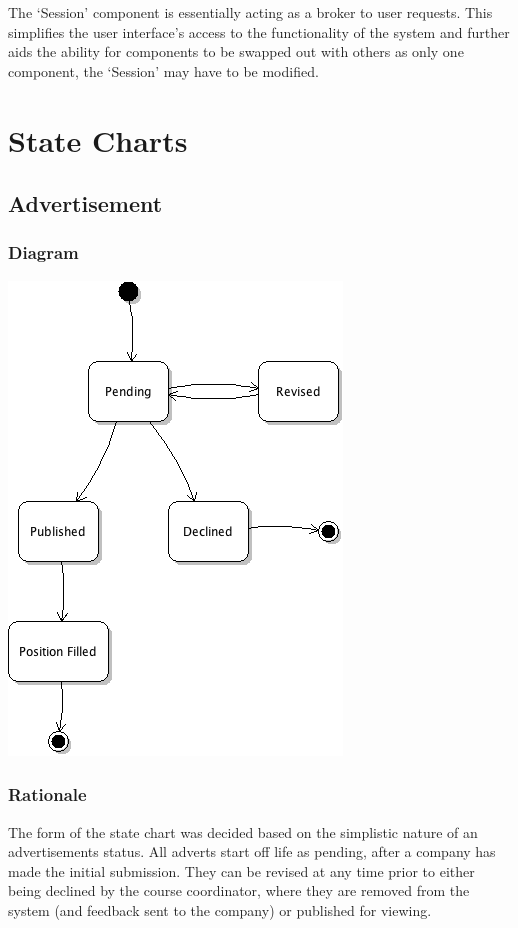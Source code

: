 \documentclass[11pt]{article}
\begin{document}
The `Session' component is essentially acting as a broker to user requests. This
simplifies the user interface's access to the functionality of the system and
further aids the ability for components to be swapped out with others as only
one component, the `Session' may have to be modified.

\newpage

\section{State Charts}

\subsection{Advertisement}

\subsubsection{Diagram}

\includegraphics{advertState.png}

\subsubsection{Rationale}

The form of the state chart was decided based on the simplistic nature of an 
advertisements status. All adverts start off life as pending, after a company
has made the initial submission. They can be revised at any time prior to either
being declined by the course coordinator, where they are removed from the system
(and feedback sent to the company) or published for viewing.
\end{document}
